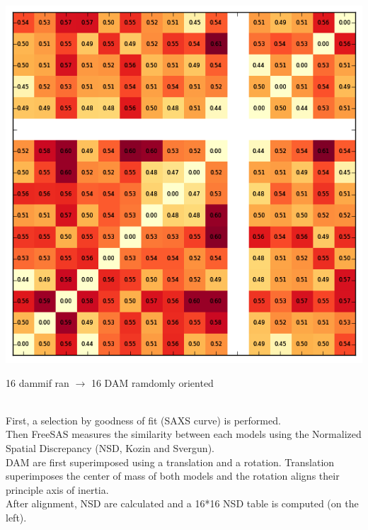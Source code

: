 \documentclass[12pt]{article}
\begin{document}
\vspace{-0.5cm}
\begin{minipage}{0.35\linewidth}
    \begin{flushleft}
    \includegraphics[scale=0.45]{nsdtable.png}
    \end{flushleft}
\end{minipage} \hfill
\begin{minipage}{0.60\linewidth}
    \begin{large}
    16 dammif ran $\longrightarrow$ 16 DAM ramdomly oriented
    \end{large}\\
    First, a selection by goodness of fit (SAXS curve) is performed.\\
    Then FreeSAS measures the similarity between each models using the 
    Normalized Spatial Discrepancy (NSD, Kozin and Svergun).\\
    DAM are first superimposed using a translation and a rotation. 
    Translation superimposes the center of mass of both models and the 
    rotation aligns their principle axis of inertia.\\
    After alignment, NSD are calculated and a 16*16 NSD table is 
    computed (on the left).
\end{minipage}
\end{document}
